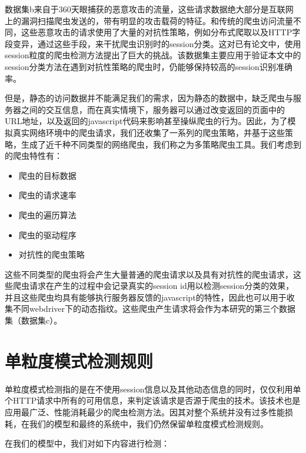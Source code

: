 \documentclass[doctor,privacy,twoside]{buaa_mac}
\begin{document}
数据集b来自于360天眼捕获的恶意攻击的流量，这些请求数据绝大部分是互联网上的漏洞扫描爬虫发送的，带有明显的攻击载荷的特征。和传统的爬虫访问流量不同，这些恶意攻击的请求使用了大量的对抗性策略，例如分布式爬取以及HTTP字段变异，通过这些手段，来干扰爬虫识别时的session分类。这对已有论文中，使用session粒度的爬虫检测方法提出了巨大的挑战。该数据集主要应用于验证本文中的session分类方法在遇到对抗性策略的爬虫时，仍能够保持较高的session识别准确率。

但是，静态的访问数据并不能满足我们的需求，因为静态的数据中，缺乏爬虫与服务器之间的交互信息，而在真实情境下，服务器可以通过改变返回的页面中的URL地址，以及返回的javascript代码来影响甚至操纵爬虫的行为。因此，为了模拟真实网络环境中的爬虫请求，我们还收集了一系列的爬虫策略，并基于这些策略，生成了近千种不同类型的网络爬虫，我们称之为多策略爬虫工具。我们考虑到的爬虫特性有：
\begin{itemize}
\item 爬虫的目标数据
\item 爬虫的请求速率
\item 爬虫的遍历算法
\item 爬虫的驱动程序
\item 对抗性的爬虫策略
\end{itemize}

这些不同类型的爬虫将会产生大量普通的爬虫请求以及具有对抗性的爬虫请求，这些爬虫请求在产生的过程中会记录真实的session id用以检测session分类的效果，并且这些爬虫均具有能够执行服务器反馈的javascript的特性，因此也可以用于收集不同webdriver下的动态指纹。这些爬虫产生请求将会作为本研究的第三个数据集（数据集c）。

\section{单粒度模式检测规则}
单粒度模式检测指的是在不使用session信息以及其他动态信息的同时，仅仅利用单个HTTP请求中所有的可用信息，来判定该请求是否源于爬虫的技术。该技术也是应用最广泛、性能消耗最少的爬虫检测方法。因其对整个系统并没有过多性能损耗，在我们的模型和最终的系统中，我们仍然保留单粒度模式检测规则。

在我们的模型中，我们对如下内容进行检测：
\end{document}
